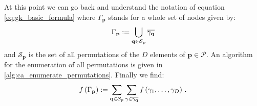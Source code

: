 \documentclass[a4paper,10pt]{article}
\begin{document}
At this point we can go back and understand
the notation of equation \eqref{eq:gk_basic_formula}
where $\Gamma_\mathbf{p}$ stands for a whole set of nodes given by:
\begin{equation}
  \Gamma_\mathbf{p} :=
  \bigcup_{\mathbf{q} \in \mathcal{S}_\mathbf{p}} \overline{\gamma_\mathbf{q}}
\end{equation}
and $\mathcal{S}_\mathbf{p}$ is the set of all permutations of the $D$
elements of $\mathbf{p} \in \mathcal{P}$. An algorithm for the enumeration
of all permutations is given in \ref{alg:ca_enumerate_permutations}.
Finally we find:
\begin{equation}
  f\left(\Gamma_\mathbf{p}\right) :=
  \sum_{\mathbf{q} \in \mathcal{S}_p}
  \sum_{\gamma \in \overline{\gamma_\mathbf{q}}}
  f\left(\gamma_1, \ldots, \gamma_D\right) \,.
\end{equation}
\end{document}
